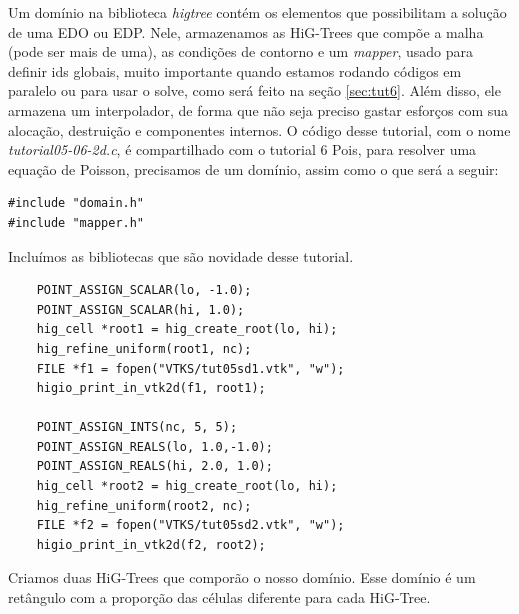 Um domínio na biblioteca \textit{higtree} contém os elementos que possibilitam a solução de uma EDO ou EDP. Nele, armazenamos as HiG-Trees que compõe a malha (pode ser mais de uma), as condições de contorno e um \textit{mapper}, usado para definir ids globais, muito importante quando estamos rodando códigos em paralelo ou para usar o solve, como será feito na seção \ref{sec:tut6}. Além disso, ele armazena um interpolador, de forma que não seja preciso gastar esforços com sua alocação, destruição e componentes internos. O código desse tutorial, com o nome \textit{tutorial05-06-2d.c}, é compartilhado com o tutorial 6 Pois, para resolver uma equação de Poisson, precisamos de um domínio, assim como o que será a seguir:
\begin{verbatim}
#include "domain.h"
#include "mapper.h"
\end{verbatim}

Incluímos as bibliotecas que são novidade desse tutorial.

\begin{verbatim}
    POINT_ASSIGN_SCALAR(lo, -1.0);
    POINT_ASSIGN_SCALAR(hi, 1.0);
    hig_cell *root1 = hig_create_root(lo, hi);
    hig_refine_uniform(root1, nc);
    FILE *f1 = fopen("VTKS/tut05sd1.vtk", "w");
    higio_print_in_vtk2d(f1, root1);

    POINT_ASSIGN_INTS(nc, 5, 5);
    POINT_ASSIGN_REALS(lo, 1.0,-1.0);
    POINT_ASSIGN_REALS(hi, 2.0, 1.0);
    hig_cell *root2 = hig_create_root(lo, hi);
    hig_refine_uniform(root2, nc);
    FILE *f2 = fopen("VTKS/tut05sd2.vtk", "w");
    higio_print_in_vtk2d(f2, root2);
\end{verbatim}

Criamos duas HiG-Trees que comporão o nosso domínio. Esse domínio é um retângulo com a proporção das células diferente para cada HiG-Tree.

